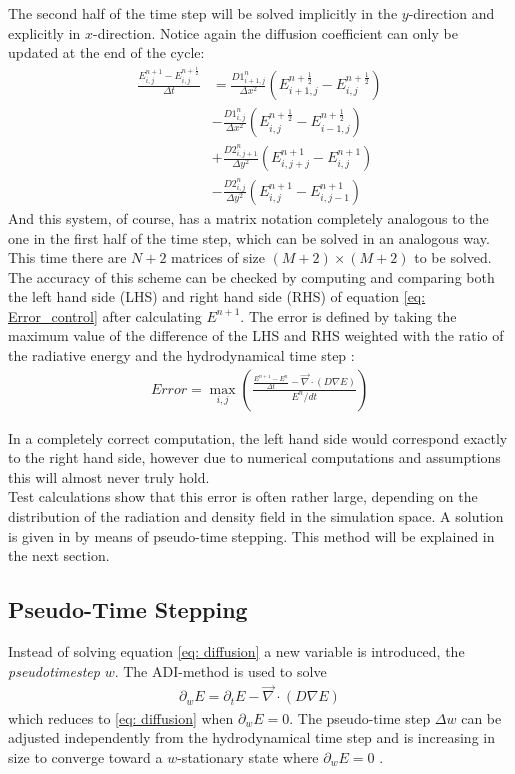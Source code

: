 The second half of the time step will be solved implicitly in the $y$-direction and explicitly in $x$-direction. Notice again the diffusion coefficient can only be updated at the end of the cycle:
\begin{align}
\frac{E_{i,j}^{n+1} - E_{i,j}^{n+\frac{1}{2}}}{\Delta t}
 &= \frac{D1_{i+1,j}^{n}}{\Delta x^2} (E_{i+1,j}^{n+\frac{1}{2}} - E_{i,j}^{n+\frac{1}{2}}) \\
 &- \frac{D1_{i,j}^{n}}{\Delta x^2} (E_{i,j}^{n+\frac{1}{2}} - E_{i-1,j}^{n+\frac{1}{2}}) \\
 &+ \frac{D2_{i,j+1}^{n}}{\Delta y^2} (E_{i,j+j}^{n+1} - E_{i,j}^{n+1}) \\
 &- \frac{D2_{i,j}^{n}}{\Delta y^2} (E_{i,j}^{n+1} - E_{i,j-1}^{n+1})
\end{align}
And this system, of course, has a matrix notation completely analogous to the one in the first half of the time step, which can be solved in an analogous way. This time there are $N+2$ matrices of size $(M+2) \times (M+2)$ to be solved. \\

The accuracy of this scheme can be checked by computing and comparing both the left hand side (LHS) and right hand side (RHS) of equation \eqref{eq: Error_control} after calculating $E^{n+1}$. The error is defined by taking the maximum value of the difference of the LHS and RHS weighted with the ratio of the radiative energy and the hydrodynamical time step \citep{Turner12001}:
\begin{align}
Error = \max_{i,j} \left(\frac{\frac{E^{n+1} - E^{n}}{\Delta t} -  \vec{\nabla} \cdot \left(D \nabla E\right)}{E^{n}/dt} \right) \label{eq: Error}
\end{align}

In a completely correct computation, the left hand side would correspond exactly to the right hand side, however due to numerical computations and assumptions this will almost never truly hold.\\

 Test calculations show that this error is often rather large, depending on the distribution of the radiation and density field in the simulation space. A solution is given in \citep{Turner12001} by means of pseudo-time stepping. This method will be explained in the next section.
 
 
\subsection{Pseudo-Time Stepping}
Instead of solving equation \eqref{eq: diffusion} a new variable is introduced, the \emph{pseudotimestep} $w$. The ADI-method is used to solve 
\begin{align}
\partial_w E = \partial_t E  - \vec{\nabla} \cdot \left(D \nabla E\right)
\end{align}
which reduces to \eqref{eq: diffusion} when $\partial_w E = 0$. The pseudo-time step $\Delta w$ can be adjusted independently from the hydrodynamical time step and is increasing in size to converge toward a $w$-stationary state where $\partial_w E = 0$ \citep{Turner12001}.\\

